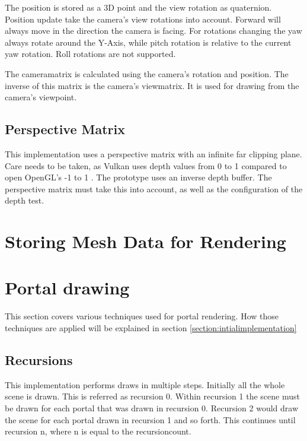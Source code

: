 The position is stored as a 3D point and the view rotation as quaternion. Position update take the camera's view rotations into account. Forward will always move in the direction the camera is facing. For rotations changing the yaw always rotate around the Y-Axis, while pitch rotation is relative to the current yaw rotation. Roll rotations are not supported.

The \gls{cameramatrix} is calculated using the camera's rotation and position. The inverse of this matrix is the camera's \gls{viewmatrix}. It is used for drawing from the camera's viewpoint.

\subsection{Perspective Matrix}
This implementation uses a perspective matrix with an infinite far clipping plane. Care needs to be taken, as Vulkan uses depth values from 0 to 1 \cite{khronos:vulkan:spec1.1} compared to open OpenGL's -1 to 1 \cite{khronos:openGL:spec4.6}. The prototype uses an inverse depth buffer. The perspective matrix must take this into account, as well as the configuration of the depth test.


\section{Storing Mesh Data for Rendering}


\section{Portal drawing}
\label{section:portaldrawing}

This section covers various techniques used for portal rendering. How those techniques are applied will be explained in section \ref{section:intialimplementation}

\subsection{Recursions}


This implementation performs draws in multiple steps. Initially all the whole scene is drawn. This is referred as recursion 0. Within recursion 1 the scene must be drawn for each portal that was drawn in recursion 0. Recursion 2 would draw the scene for each portal drawn in recursion 1 and so forth. This continues until recursion n, where n is equal to the \gls{recursioncount}.


